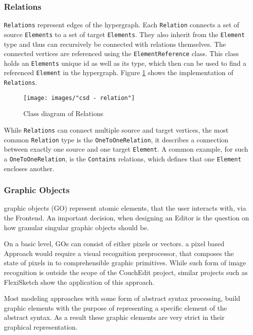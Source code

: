 \subsubsection{Relations}
\texttt{Relations} represent edges of the hypergraph. Each \texttt{Relation} connects a set of source \texttt{Elements} to a set of target \texttt{Elements}. They also inherit from the \texttt{Element} type and thus can recursively be connected with relations themselves. The connected vertices are referenced using the \texttt{ElementReference} class. This class holds an \texttt{Elements} unique id as well as its type, which then can be used to find a referenced \texttt{Element} in the hypergraph. Figure \ref{fig:relations} shows the implementation of \texttt{Relations}. 

\begin{figure}[ht]
  \centering
  \texttt{[image: images/"csd - relation"]}
  \caption{Class diagram of Relations}
  \label{fig:relations}
\end{figure}

 While \texttt{Relations} can connect multiple source and target vertices, the most common \texttt{Relation} type is the \texttt{OneToOneRelation}, it describes a connection between exactly one source and one target \texttt{Element}. A common example, for such a \texttt{OneToOneRelation}, is the \texttt{Contains} relations, which defines that one \texttt{Element} encloses another.  


\subsubsection{Graphic Objects}
graphic objects (GO) represent atomic elements, that the user interacts with, via the Frontend. An important decision, when designing an Editor is the question on how granular singular graphic objects should be. 

On a basic level, GOs can consist of either pixels or vectors. a pixel based Approach would require a visual recognition preprocessor, that composes the state of pixels in to comprehensible graphic primitives. While such form of image recognition is outside the scope of the CouchEdit project, similar projects such as FlexiSketch \cite{wuest_flexisketch_2015} show the application of this approach.

Most modeling approaches with some form of abstract syntax processing, build graphic elements with the purpose of representing a specific element of the abstract syntax. As a result these graphic elements are very strict in their graphical representation. 

